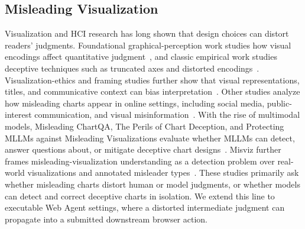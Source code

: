 \documentclass[11pt]{article}
\begin{document}
\subsection{Misleading Visualization}
Visualization and HCI research has long shown that design choices can distort readers' judgments. Foundational graphical-perception work studies how visual encodings affect quantitative judgment~\citep{heer2010crowdsourcing}, and classic empirical work studies deceptive techniques such as truncated axes and distorted encodings~\citep{pandey2015deceptive}. Visualization-ethics and framing studies further show that visual representations, titles, and communicative context can bias interpretation~\citep{correll2019ethical,kong2018frames}. Other studies analyze how misleading charts appear in online settings, including social media, public-interest communication, and visual misinformation~\citep{lo2023misleading,doan2020misrepresenting,brennen2021visuals}. With the rise of multimodal models, Misleading ChartQA, The Perils of Chart Deception, and Protecting MLLMs against Misleading Visualizations evaluate whether MLLMs can detect, answer questions about, or mitigate deceptive chart designs~\citep{misleadingchartqa2025,mahbub2025perils,tonglet2026misleadingvisualizations}. Misviz further frames misleading-visualization understanding as a detection problem over real-world visualizations and annotated misleader types~\citep{misviz2026}. These studies primarily ask whether misleading charts distort human or model judgments, or whether models can detect and correct deceptive charts in isolation. We extend this line to executable Web Agent settings, where a distorted intermediate judgment can propagate into a submitted downstream browser action.
\end{document}
